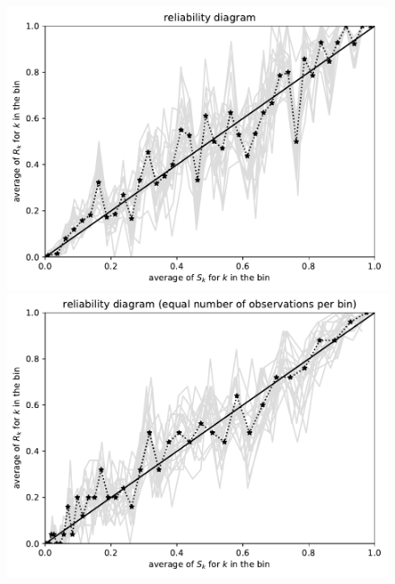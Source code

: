 \documentclass{article}
\begin{document}
\begin{figure}
\begin{centering}
\parbox{\imsize}{\includegraphics[width=\imsize]
                {./codes/unweighted/1000_40_1_3/equiprob.pdf}}
\quad\quad
\parbox{\imsize}{\includegraphics[width=\imsize]
                {./codes/unweighted/1000_40_1_3/equisamp.pdf}}

\vspace{\vertsep}


\end{centering}
\end{figure}
\end{document}
